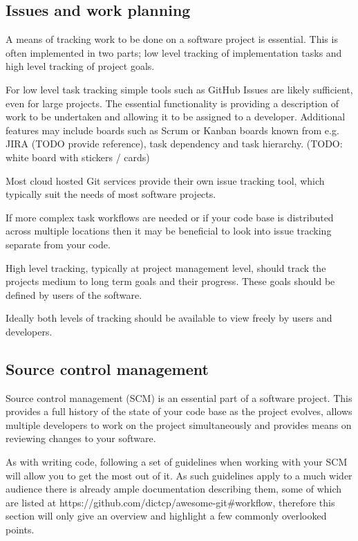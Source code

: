 \documentclass[jnr]{iosart2x}
\begin{document}
\subsection{Issues and work planning}
\label{Issues and work planning}

A means of tracking work to be done on a software project is essential.
This is often implemented in two parts; low level tracking of implementation tasks and high level tracking of project goals.

For low level task tracking simple tools such as GitHub Issues are likely sufficient, even for large projects.
The essential functionality is providing a description of work to be undertaken and allowing it to be assigned to a developer.
Additional features may include boards such as Scrum or Kanban boards known from e.g.\/ JIRA (TODO provide reference), task dependency and task hierarchy. (TODO: white board with stickers / cards)

Most cloud hosted Git services provide their own issue tracking tool, which typically suit the needs of most software projects.

If more complex task workflows are needed or if your code base is distributed across multiple locations then it may be beneficial to look into issue tracking separate from your code.

High level tracking, typically at project management level, should track the projects medium to long term goals and their progress.
These goals should be defined by users of the software.

Ideally both levels of tracking should be available to view freely by users and developers.

\subsection{Source control management}
\label{Source control management}

Source control management (SCM) is an essential part of a software project.
This provides a full history of the state of your code base as the project evolves, allows multiple developers to work on the project simultaneously and provides means on reviewing changes to your software.

As with writing code, following a set of guidelines when working with your SCM will allow you to get the most out of it.
As such guidelines apply to a much wider audience there is already ample documentation describing them, some of which are listed at https://github.com/dictcp/awesome-git\#workflow, therefore this section will only give an overview and highlight a few commonly overlooked points.
\end{document}
